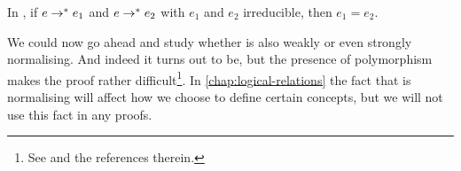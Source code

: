 \begin{corollarynoproof}
    \label{cor:determinism-multistep}
    In \langpure{}, if $e \to^* e_1$ and $e \to^* e_2$ with $e_1$ and $e_2$ irreducible, then $e_1 = e_2$.
\end{corollarynoproof}
%
We could now go ahead and study whether \langpure{} is also weakly or even strongly normalising. And indeed it turns out to be, but the presence of polymorphism makes the proof rather difficult\footnote{See \textcite[§23.5]{pierce-types} and the references therein.}. In \cref{chap:logical-relations} the fact that \langpure{} is normalising will affect how we choose to define certain concepts, but we will not use this fact in any proofs.
